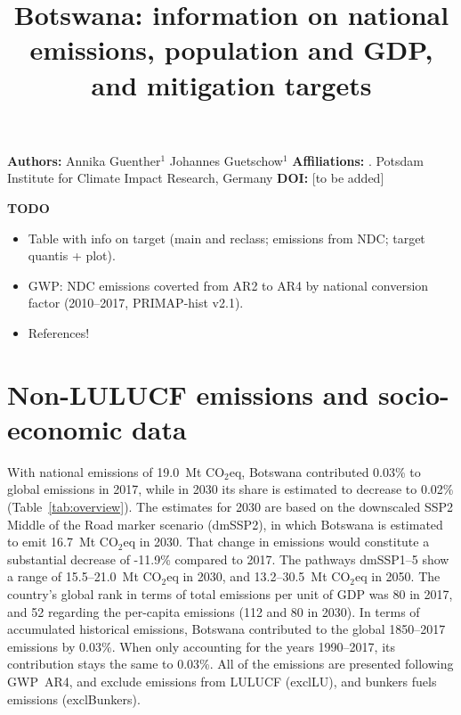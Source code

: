 \documentclass[12pt]{article}
\title{ \bfseries \color{PIKorange} Botswana: information on national emissions, population and GDP, and mitigation targets}
\begin{document}
 \maketitle

 \noindent \textbf{Authors:} \newline
 \indent Annika Guenther$^{1}$ \newline
 \indent Johannes Guetschow$^{1}$ \newline
 \noindent \textbf{Affiliations:} \newline
 . Potsdam Institute for Climate Impact Research, Germany \newline
 \noindent \textbf{DOI:} [to be added] \newline

 \textbf{TODO}
 \begin{itemize}
 \item Table with info on target (main and reclass; emissions from NDC; target quantis + plot).
 \item GWP: NDC emissions coverted from AR2 to AR4 by national conversion factor (2010--2017, PRIMAP-hist v2.1).
 \item References!
 \end{itemize}

 \newpage %
 \section{Non-LULUCF emissions and socio-economic data}
 \label{sec:nonLULUCFSocioEco}
 With national emissions of 19.0~Mt CO$_2$eq, Botswana contributed 0.03\% to global emissions in 2017, while in 2030 its share is estimated to decrease to 0.02\% (Table~\ref{tab:overview}).
 The estimates for 2030 are based on the downscaled SSP2 Middle of the Road marker scenario (dmSSP2), in which Botswana is estimated to emit 16.7~Mt CO$_2$eq in 2030.
 That change in emissions would constitute a substantial decrease of -11.9\% compared to 2017. 
 The pathways dmSSP1--5 show a range of 15.5--21.0~Mt CO$_2$eq in 2030, and 13.2--30.5~Mt CO$_2$eq in 2050.
 The country's global rank in terms of total emissions per unit of GDP was 80 in 2017, and 52 regarding the per-capita emissions (112 and 80 in 2030).
 In terms of accumulated historical emissions, Botswana contributed to the global 1850--2017 emissions by 0.03\%. 
 When only accounting for the years 1990--2017, its contribution stays the same to 0.03\%.
 All of the emissions are presented following GWP~AR4, and exclude emissions from LULUCF (exclLU), and bunkers fuels emissions (exclBunkers).
\end{document}
